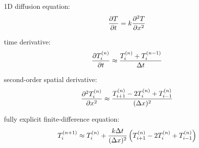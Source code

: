 \newcommand{\tni}{\ensuremath{T^{(n)}_i}}
\begin{frame}{}
  1D diffusion equation:
  \[
    {\partial T\over\partial t}=k{\partial^2 T\over\partial x^2}
  \]

  time derivative:
  \[
    {\partial\tni\over\partial t}\approx{\tni+T^{(n-1)}_i\over\Delta t}
  \]

  second-order spatial derivative:
  \[
    {\partial^2\tni\over\partial x^2}\approx{T^{(n)}_{i+1}-2T^{(n)}_i+T^{(n)}_{i-1}\over(\Delta x)^2}
  \]

  fully explicit finite-difference equation:
  \[
    T^{(n+1)}_i\approx T^{(n)}_i+{k\Delta t\over(\Delta x)^2}\left(T^{(n)}_{i+1}-2T^{(n)}_i+T^{(n)}_{i-1}\right)
  \]

\end{frame}
